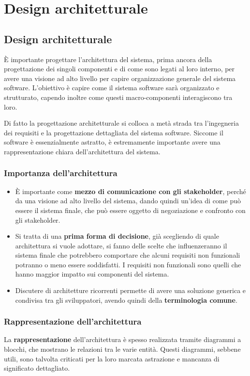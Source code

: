 \chapter{Design architetturale}
\section{Design architetturale}
È importante progettare l'architettura del sistema, prima ancora della progettazione 
dei singoli componenti e di come sono legati al loro interno, per avere una visione ad 
alto livello per capire organizzazione generale del sistema software.
L'obiettivo è capire come il sistema software sarà organizzato e strutturato, 
capendo inoltre come questi macro-componenti interagiscono tra loro.

Di fatto la progettazione architetturale si colloca a metà strada tra l'ingegneria dei
requisiti e la progettazione dettagliata del sistema software. Siccome il software è 
essenzialmente astratto, è estremamente importante avere una rappresentazione chiara
dell'architettura del sistema.
\subsection{Importanza dell'architettura}
\begin{itemize}
    \item È importante come \textbf{mezzo di comunicazione con gli stakeholder}, perché da una visione
    ad alto livello del sistema, dando quindi un'idea di come può essere il sistema finale, che 
    può essere oggetto di negoziazione e confronto con gli stakeholder. 
    
    \item Si tratta di una \textbf{prima forma di decisione}, già scegliendo di quale architettura
    si vuole
    adottare, si fanno delle scelte che influenzeranno il sistema finale che potrebbero comportare 
    che alcuni requisiti non funzionali potranno o meno essere soddisfatti. I requisiti non funzionali
    sono quelli che hanno maggior impatto sui componenti del sistema.
    \item Discutere di architetture ricorrenti permette di avere una soluzione generica e condivisa 
    tra gli sviluppatori, avendo quindi della \textbf{terminologia comune}.
\end{itemize}
\subsection{Rappresentazione dell'architettura}
La \textbf{rappresentazione} dell'architettura è spesso realizzata tramite diagrammi a blocchi,
che mostrano le relazioni tra le varie entità. Questi diagrammi, sebbene utili, sono
talvolta criticati per la loro marcata astrazione e mancanza di significato dettagliato.

